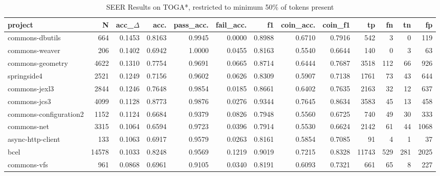 \begin{table*}
\centering
\caption{SEER Results on TOGA*, restricted to minimum 50\% of tokens present}
\label{tab:toga_results_50}
\begin{tabular}{lrrrrrrrrrrrr}
\toprule
                project &       N &  acc\_$\Delta$ &    acc. &  pass\_acc. &  fail\_acc. &      f1 &  coin\_acc. &  coin\_f1 &      tp &    fn &    tn &     fp \\
\midrule
        commons-dbutils &     664 &      0.1453 &  0.8163 &     0.9945 &     0.0000 &  0.8988 &     0.6710 &   0.7916 &     542 &     3 &     0 &    119 \\
         commons-weaver &     206 &      0.1402 &  0.6942 &     1.0000 &     0.0455 &  0.8163 &     0.5540 &   0.6644 &     140 &     0 &     3 &     63 \\
       commons-geometry &    4622 &      0.1310 &  0.7754 &     0.9691 &     0.0665 &  0.8714 &     0.6444 &   0.7687 &    3518 &   112 &    66 &    926 \\
            springside4 &    2521 &      0.1249 &  0.7156 &     0.9602 &     0.0626 &  0.8309 &     0.5907 &   0.7138 &    1761 &    73 &    43 &    644 \\
          commons-jexl3 &    2844 &      0.1246 &  0.7648 &     0.9854 &     0.0185 &  0.8661 &     0.6402 &   0.7635 &    2163 &    32 &    12 &    637 \\
           commons-jcs3 &    4099 &      0.1128 &  0.8773 &     0.9876 &     0.0276 &  0.9344 &     0.7645 &   0.8634 &    3583 &    45 &    13 &    458 \\
 commons-configuration2 &    1152 &      0.1124 &  0.6684 &     0.9379 &     0.0826 &  0.7948 &     0.5560 &   0.6725 &     740 &    49 &    30 &    333 \\
            commons-net &    3315 &      0.1064 &  0.6594 &     0.9723 &     0.0396 &  0.7914 &     0.5530 &   0.6624 &    2142 &    61 &    44 &   1068 \\
      async-http-client &     133 &      0.1063 &  0.6917 &     0.9579 &     0.0263 &  0.8161 &     0.5854 &   0.7085 &      91 &     4 &     1 &     37 \\
                   bcel &   14578 &      0.1033 &  0.8248 &     0.9569 &     0.1219 &  0.9019 &     0.7215 &   0.8328 &   11743 &   529 &   281 &   2025 \\
            commons-vfs &     961 &      0.0868 &  0.6961 &     0.9105 &     0.0340 &  0.8191 &     0.6093 &   0.7321 &     661 &    65 &     8 &    227 \\

\end{tabular}
\end{table*}
